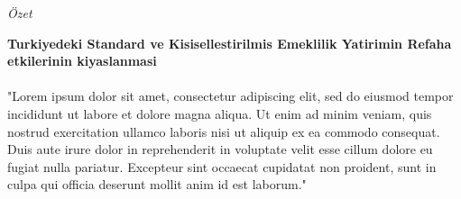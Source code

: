 \documentclass[
11pt, %
english, %
singlespacing, %
headsepline, %
]{MastersDoctoralThesis} %
\begin{document}
\begin{center}
	{\Huge \textit{Özet}}
\end{center}

\vspace{50pt}

\begin{center}
	\textbf{Turkiyedeki Standard ve Kisisellestirilmis Emeklilik Yatirimin Refaha etkilerinin kiyaslanmasi}
\end{center}

\vspace{50pt}

\paragraph*{}"Lorem ipsum dolor sit amet, consectetur adipiscing elit, sed do eiusmod tempor incididunt ut labore et dolore magna aliqua. Ut enim ad minim veniam, quis nostrud exercitation ullamco laboris nisi ut aliquip ex ea commodo consequat. Duis aute irure dolor in reprehenderit in voluptate velit esse cillum dolore eu fugiat nulla pariatur. Excepteur sint occaecat cupidatat non proident, sunt in culpa qui officia deserunt mollit anim id est laborum."

\end{document}
